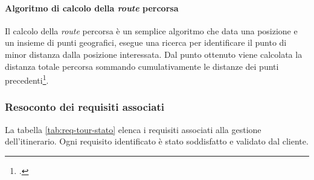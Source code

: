 \paragraph{Algoritmo di calcolo della \textit{route} percorsa}
Il calcolo della \textit{route} percorsa è un semplice algoritmo che data una posizione e un insieme di punti geografici, esegue una ricerca per identificare il punto di minor distanza dalla posizione interessata. Dal punto ottenuto viene calcolata la distanza totale percorsa sommando cumulativamente le distanze dei punti precedenti\footcite{site:gpx-doc}. 

\subsubsection{Resoconto dei requisiti associati}
La tabella \ref{tab:req-tour-stato} elenca i requisiti associati alla gestione dell'itinerario. Ogni requisito identificato è stato soddisfatto e validato dal cliente.

